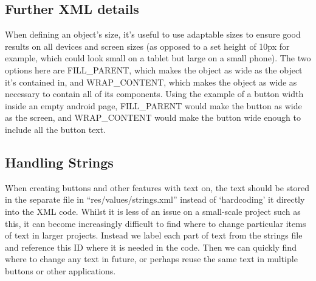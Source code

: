 \subsection{Further XML details}
When defining an object’s size, it’s useful to use adaptable sizes to ensure good results on all devices and screen sizes (as opposed to a set height of 10px for example, which could look small on a tablet but large on a small phone). The two options here are FILL\_PARENT, which makes the object as wide as the object it’s contained in, and WRAP\_CONTENT, which makes the object as wide as necessary to contain all of its components. Using the example of a button width inside an empty android page, FILL\_PARENT would make the button as wide as the screen, and WRAP\_CONTENT would make the button wide enough to include all the button text.
\subsection{Handling Strings}
When creating buttons and other features with text on, the text should be stored in the separate file in “res/values/strings.xml” instead of ‘hardcoding’ it directly into the XML code. Whilst it is less of an issue on a small-scale project such as this, it can become increasingly difficult to find where to change particular items of text in larger projects. Instead we label each part of text from the strings file and reference this ID where it is needed in the code. Then we can quickly find where to change any text in future, or perhaps reuse the same text in multiple buttons or other applications.
